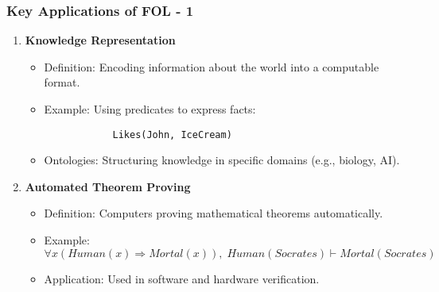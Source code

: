 \documentclass[aspectratio=169]{beamer}
\begin{document}
\begin{frame}[fragile]
    \frametitle{Key Applications of FOL - 1}
    
    \begin{enumerate}
        \item \textbf{Knowledge Representation}
        \begin{itemize}
            \item Definition: Encoding information about the world into a computable format.
            \item Example: Using predicates to express facts: 
            \begin{lstlisting}
            Likes(John, IceCream)
            \end{lstlisting}
            \item Ontologies: Structuring knowledge in specific domains (e.g., biology, AI).
        \end{itemize}
        
        \item \textbf{Automated Theorem Proving}
        \begin{itemize}
            \item Definition: Computers proving mathematical theorems automatically.
            \item Example: 
            \begin{equation}
            \forall x (Human(x) \Rightarrow Mortal(x)), \; Human(Socrates) \vdash Mortal(Socrates)
            \end{equation}
            \item Application: Used in software and hardware verification.
        \end{itemize}
    \end{enumerate}
\end{frame}
\end{document}
